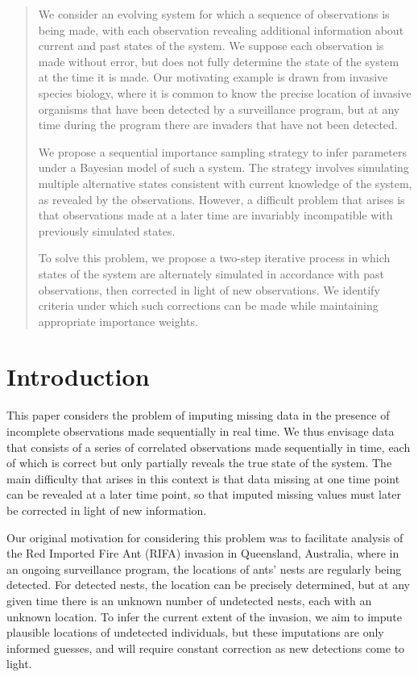 \begin{abstract}

We consider an evolving system for which a sequence of observations is being made, with each observation revealing additional information about current and past states of the system. We suppose each observation is made without error, but does not fully determine the state of the system at the time it is made. Our motivating example is drawn from invasive species biology, where it is common to know the precise location of invasive organisms that have been detected by a surveillance program, but at any time during the program there are invaders that have not been detected.

We propose a sequential importance sampling strategy to infer parameters under a Bayesian model of such a system. The strategy involves simulating multiple alternative states consistent with current knowledge of the system, as revealed by the observations. However, a difficult problem that arises is that observations made at a later time are invariably incompatible with previously simulated states.

To solve this problem, we propose a two-step iterative process in which states of the system are alternately simulated in accordance with past observations, then corrected in light of new observations. We identify criteria under which such corrections can be made while maintaining appropriate importance weights.

\end{abstract}

\section{Introduction}
This paper considers the problem of imputing missing data in the presence of incomplete observations made sequentially in real time. We thus envisage data that consists of a series of correlated observations made sequentially in time, each of which is correct but only partially reveals the true state of the system. The main difficulty that arises in this context is that data missing at one time point can be revealed at a later time point, so that imputed missing values must later be corrected in light of new information.

Our original motivation for considering this problem was to facilitate analysis of the Red Imported Fire Ant (RIFA) invasion in Queensland, Australia, where in an ongoing surveillance program, the locations of ants’ nests are regularly being detected. For detected nests, the location can be precisely determined, but at any given time there is an unknown number of undetected nests, each with an unknown location. To infer the current extent of the invasion, we aim to impute plausible locations of undetected individuals, but these imputations are only informed guesses, and will require constant correction as new detections come to light.

